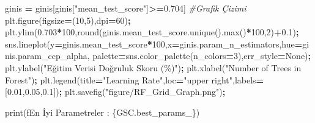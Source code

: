 \documentclass[12pt,twoside]{deuthesis}
\newenvironment{Shaded}{\begin{snugshade}}{\end{snugshade}}
\newcommand{\BuiltInTok}[1]{#1}
\newcommand{\CommentTok}[1]{\textcolor[rgb]{0.56,0.35,0.01}{\textit{#1}}}
\newcommand{\DecValTok}[1]{\textcolor[rgb]{0.00,0.00,0.81}{#1}}
\newcommand{\FloatTok}[1]{\textcolor[rgb]{0.00,0.00,0.81}{#1}}
\newcommand{\NormalTok}[1]{#1}
\newcommand{\OperatorTok}[1]{\textcolor[rgb]{0.81,0.36,0.00}{\textbf{#1}}}
\newcommand{\SpecialCharTok}[1]{\textcolor[rgb]{0.00,0.00,0.00}{#1}}
\newcommand{\SpecialStringTok}[1]{\textcolor[rgb]{0.31,0.60,0.02}{#1}}
\newcommand{\StringTok}[1]{\textcolor[rgb]{0.31,0.60,0.02}{#1}}
\newcommand{\VariableTok}[1]{\textcolor[rgb]{0.00,0.00,0.00}{#1}}
\begin{document}
\begin{Shaded}
\begin{Highlighting}[]
\NormalTok{ginis }\OperatorTok{=}\NormalTok{ ginis[ginis[}\StringTok{"mean\_test\_score"}\NormalTok{]}\OperatorTok{\textgreater{}=}\FloatTok{0.704}\NormalTok{]}
\CommentTok{\#Grafik Çizimi}
\NormalTok{plt.figure(figsize}\OperatorTok{=}\NormalTok{(}\DecValTok{10}\NormalTok{,}\DecValTok{5}\NormalTok{),dpi}\OperatorTok{=}\DecValTok{60}\NormalTok{)}\OperatorTok{;}
\NormalTok{plt.ylim(}\FloatTok{0.703}\OperatorTok{*}\DecValTok{100}\NormalTok{,}\BuiltInTok{round}\NormalTok{(ginis.mean\_test\_score.unique().}\BuiltInTok{max}\NormalTok{()}\OperatorTok{*}\DecValTok{100}\NormalTok{,}\DecValTok{2}\NormalTok{)}\OperatorTok{+}\FloatTok{0.1}\NormalTok{)}\OperatorTok{;}
\NormalTok{sns.lineplot(y}\OperatorTok{=}\NormalTok{ginis.mean\_test\_score}\OperatorTok{*}\DecValTok{100}\NormalTok{,x}\OperatorTok{=}\NormalTok{ginis.param\_n\_estimators,hue}\OperatorTok{=}\NormalTok{ginis.param\_ccp\_alpha,}
\NormalTok{palette}\OperatorTok{=}\NormalTok{sns.color\_palette(n\_colors}\OperatorTok{=}\DecValTok{3}\NormalTok{),err\_style}\OperatorTok{=}\VariableTok{None}\NormalTok{)}\OperatorTok{;}
\NormalTok{plt.ylabel(}\StringTok{"Eğitim Verisi Doğruluk Skoru (\%)"}\NormalTok{)}\OperatorTok{;}
\NormalTok{plt.xlabel(}\StringTok{"Number of Trees in Forest"}\NormalTok{)}\OperatorTok{;}
\NormalTok{plt.legend(title}\OperatorTok{=}\StringTok{"Learning Rate"}\NormalTok{,loc}\OperatorTok{=}\StringTok{"upper right"}\NormalTok{,labels}\OperatorTok{=}\NormalTok{[}\FloatTok{0.01}\NormalTok{,}\FloatTok{0.05}\NormalTok{,}\FloatTok{0.1}\NormalTok{])}\OperatorTok{;}
\NormalTok{plt.savefig(}\StringTok{"figure/RF\_Grid\_Graph.png"}\NormalTok{)}\OperatorTok{;}
\end{Highlighting}
\end{Shaded}
\begin{Shaded}
\begin{Highlighting}[]
\BuiltInTok{print}\NormalTok{(}\SpecialStringTok{f\textquotesingle{}En İyi Parametreler : }\SpecialCharTok{\{}\NormalTok{GSC}\SpecialCharTok{.}\NormalTok{best\_params\_}\SpecialCharTok{\}}\SpecialStringTok{\textquotesingle{}}\NormalTok{)}
\end{Highlighting}
\end{Shaded}
\end{document}
